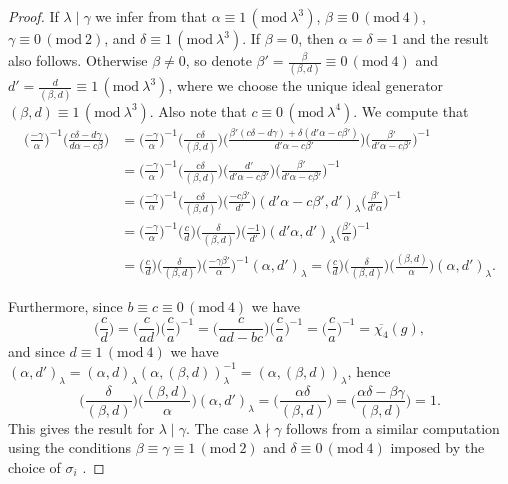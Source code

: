 \documentclass[12pt,reqno]{amsart}
\numberwithin{equation}{section}
\renewcommand{\pmod}[1]{\, (\mathrm{mod}\ #1)}
\begin{document}
\begin{proof}
If $\lambda \mid \gamma$ we infer from \cite[Table 1]{Suz1} that $\alpha \equiv 1\pmod{\lambda^3}$, $\beta \equiv 0 \pmod{4}$, $\gamma \equiv 0 \pmod{2}$, and $\delta \equiv 1 \pmod{\lambda^3}$. If $\beta = 0$, then $\alpha = \delta = 1$ and the result also follows. Otherwise $\beta\neq 0$, so denote $\beta' = \frac{\beta}{(\beta, d)} \equiv 0 \pmod{4}$ and $d' = \frac{d}{(\beta, d)} \equiv 1 \pmod{\lambda^3}$, where we choose the unique ideal generator $(\beta, d) \equiv 1 \pmod{\lambda^3}$. Also note that $c \equiv 0 \pmod{\lambda^4}$. We compute that
\begin{align*}
        \Big(\frac{-\gamma}{\alpha}\Big)^{-1} \Big(\frac{c\delta - d\gamma}{d\alpha - c\beta}\Big) &= \Big(\frac{-\gamma}{\alpha}\Big)^{-1} \Big(\frac{c\delta}{(\beta, d)}\Big) \Big(\frac{\beta'(c\delta - d\gamma)+\delta(d'\alpha - c\beta')}{d'\alpha - c\beta'}\Big)\Big(\frac{\beta'}{d'\alpha - c\beta'}\Big)^{-1} \\
        &= \Big(\frac{-\gamma}{\alpha}\Big)^{-1} \Big(\frac{c\delta}{(\beta, d)}\Big) \Big(\frac{d'}{d'\alpha - c\beta'}\Big)\Big(\frac{\beta'}{d'\alpha - c\beta'}\Big)^{-1} \\
        &= \Big(\frac{-\gamma}{\alpha}\Big)^{-1} \Big(\frac{c\delta}{(\beta, d)}\Big) \Big(\frac{-c\beta'}{d'}\Big) (d'\alpha - c\beta', d')_\lambda \Big(\frac{\beta'}{d'\alpha}\Big)^{-1} \\
        &= \Big(\frac{-\gamma}{\alpha}\Big)^{-1} \Big(\frac{c}{d}\Big) \Big(\frac{\delta}{(\beta, d)}\Big) \Big(\frac{-1}{d'}\Big) (d'\alpha, d')_\lambda \Big(\frac{\beta'}{\alpha}\Big)^{-1} \\
        & = \Big(\frac{c}{d}\Big) \Big(\frac{\delta}{(\beta, d)}\Big) \Big(\frac{-\gamma\beta'}{\alpha}\Big)^{-1} (\alpha, d')_\lambda  = \Big(\frac{c}{d}\Big) \Big(\frac{\delta}{(\beta, d)}\Big) \Big(\frac{(\beta, d)}{\alpha}\Big) (\alpha, d')_\lambda.
    \end{align*}

    Furthermore, since $b\equiv c\equiv 0 \pmod{4}$ we have
    \begin{equation*}
        \Big(\frac{c}{d}\Big) = \Big(\frac{c}{ad}\Big) \Big(\frac{c}{a}\Big)^{-1} = \Big(\frac{c}{ad-bc}\Big) \Big(\frac{c}{a}\Big)^{-1} = \Big(\frac{c}{a}\Big)^{-1} = \overline{\chi_4}(g),
    \end{equation*}
    and since $d\equiv 1\pmod{4}$ we have $(\alpha, d')_\lambda = (\alpha, d)_\lambda (\alpha, (\beta, d))^{-1}_\lambda = (\alpha, (\beta, d))_\lambda$, hence
    \begin{equation*}
        \Big(\frac{\delta}{(\beta, d)}\Big) \Big(\frac{(\beta, d)}{\alpha}\Big) (\alpha, d')_\lambda = \Big(\frac{\alpha\delta}{(\beta, d)}\Big) = \Big(\frac{\alpha\delta -\beta\gamma}{(\beta, d)}\Big) = 1.
    \end{equation*}
    This gives the result for $\lambda \mid \gamma$. The case $\lambda \nmid \gamma$ follows from a similar computation using the conditions $\beta \equiv \gamma \equiv 1 \pmod{2}$ and $\delta \equiv 0 \pmod{4}$ imposed by the choice of $\sigma_i$ \cite[Table~1]{Suz1}.
\end{proof}
\end{document}
